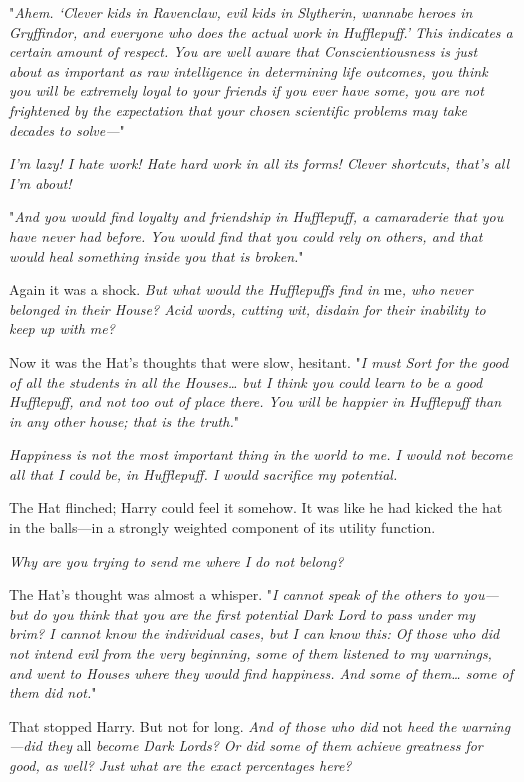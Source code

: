 "\emph{Ahem. `Clever kids in Ravenclaw, evil kids in Slytherin, wannabe heroes
in Gryffindor, and everyone who does the actual work in Hufflepuff.' This
indicates a certain amount of respect. You are well aware that
Conscientiousness is just about as important as raw intelligence in determining
life outcomes, you think you will be extremely loyal to your friends if you
ever have some, you are not frightened by the expectation that your chosen
scientific problems may take decades to solve---}"

\emph{I'm lazy! I hate work! Hate hard work in all its forms! Clever shortcuts,
that's all I'm about!}

"\emph{And you would find loyalty and friendship in Hufflepuff, a camaraderie
that you have never had before. You would find that you could rely on others,
and that would heal something inside you that is broken.}"

Again it was a shock. \emph{But what would the Hufflepuffs find in} me\emph{,
who never belonged in their House? Acid words, cutting wit, disdain for their
inability to keep up with me?}

Now it was the Hat's thoughts that were slow, hesitant. "\emph{I must Sort for
the good of all the students in all the Houses{\ldots} but I think you could
learn to be a good Hufflepuff, and not too out of place there. You will be
happier in Hufflepuff than in any other house; that is the truth.}"

\emph{Happiness is not the most important thing in the world to me. I would not
become all that I could be, in Hufflepuff. I would sacrifice my potential.}

The Hat flinched; Harry could feel it somehow. It was like he had kicked the
hat in the balls---in a strongly weighted component of its utility function.

\emph{Why are you trying to send me where I do not belong?}

The Hat's thought was almost a whisper. "\emph{I cannot speak of the others to
you---but do you think that you are the first potential Dark Lord to pass under
my brim? I cannot know the individual cases, but I can know this: Of those who
did not intend evil from the very beginning, some of them listened to my
warnings, and went to Houses where they would find happiness. And some of
them{\ldots} some of them did not.}"

That stopped Harry. But not for long. \emph{And of those who did} not \emph{
heed the warning---did they} all \emph{become Dark Lords? Or did some of them
achieve greatness for good, as well? Just what are the exact percentages here?}

